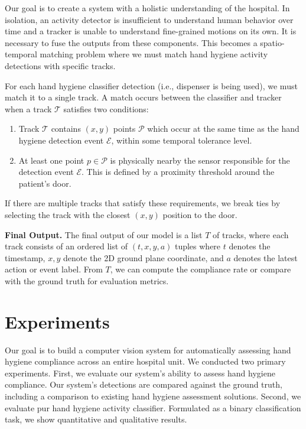 \documentclass[twoside,11pt]{article}
\begin{document}
Our goal is to create a system with a holistic understanding of the hospital.
In isolation, an activity detector is insufficient to understand human behavior over time and a tracker is unable to understand fine-grained motions on its own.
It is necessary to fuse the outputs from these components.
This becomes a spatio-temporal matching problem where we must match hand hygiene activity detections with specific tracks.

For each hand hygiene classifier detection (i.e., dispenser is being used), we must match it to a single track.
A match occurs between the classifier and tracker when a track $\mathcal{T}$ satisfies two conditions:
\begin{enumerate}[topsep=0pt,itemsep=0ex,partopsep=0ex,parsep=0ex]
    \item Track $\mathcal{T}$ contains $(x,y)$ points $\mathcal{P}$ which occur at the same time as the hand hygiene detection event $\mathcal{E}$, within some temporal tolerance level.
    \item At least one point $p \in \mathcal{P}$ is physically nearby the sensor responsible for the detection event $\mathcal{E}$. This is defined by a proximity threshold around the patient's door.
\end{enumerate}
If there are multiple tracks that satisfy these requirements, we break ties by selecting the track with the closest $(x, y)$ position to the door.

\textbf{Final Output.} The final output of our model is a list $T$ of tracks, where each track consists of an ordered list of $(t, x, y, a)$ tuples where $t$ denotes the timestamp, $x, y$ denote the 2D ground plane coordinate, and $a$ denotes the latest action or event label.
From $T$, we can compute the compliance rate or compare with the ground truth for evaluation metrics.

\section{Experiments} 

Our goal is to build a computer vision system for automatically assessing hand hygiene compliance across an entire hospital unit.
We conducted two primary experiments.
First, we evaluate our system's ability to assess hand hygiene compliance.
Our system's detections are compared against the ground truth, including a comparison to existing hand hygiene assessment solutions.
Second, we evaluate pur hand hygiene activity classifier.
Formulated as a binary classification task, we show quantitative and qualitative results.
\end{document}
